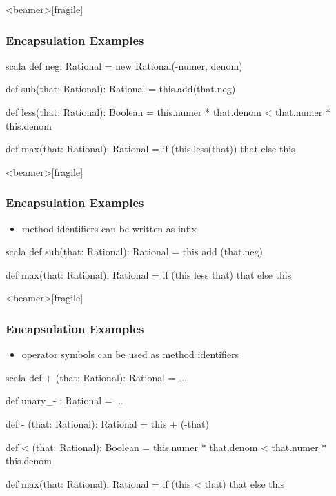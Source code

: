 \documentclass[dvipsnames]{beamer}
\theoremstyle{plain}
\begin{document}
\begin{frame}<beamer>[fragile]
  \frametitle{Encapsulation Examples}

  \begin{example}[Scala]
    \begin{pygments}{scala}
    def neg: Rational =
        new Rational(-numer, denom)

    def sub(that: Rational): Rational =
        this.add(that.neg)

    def less(that: Rational): Boolean =
        this.numer * that.denom < that.numer * this.denom

    def max(that: Rational): Rational =
        if (this.less(that)) that else this
    \end{pygments}
  \end{example}
\end{frame}

\begin{frame}<beamer>[fragile]
  \frametitle{Encapsulation Examples}

  \begin{example}[Scala]
    \begin{itemize}
      \item method identifiers can be written as infix
    \end{itemize}

    \begin{pygments}{scala}
    def sub(that: Rational): Rational =
        this add (that.neg)

    def max(that: Rational): Rational =
        if (this less that) that else this
    \end{pygments}
  \end{example}
\end{frame}

\begin{frame}<beamer>[fragile]
  \frametitle{Encapsulation Examples}

  \begin{example}[Scala]
    \begin{itemize}
      \item operator symbols can be used as method identifiers
    \end{itemize}

    \begin{pygments}{scala}
    def + (that: Rational): Rational = ...

    def unary_- : Rational = ...

    def - (that: Rational): Rational =
        this + (-that)

    def < (that: Rational): Boolean =
        this.numer * that.denom < that.numer * this.denom

    def max(that: Rational): Rational =
        if (this < that) that else this
    \end{pygments}
  \end{example}
\end{frame}
\end{document}
